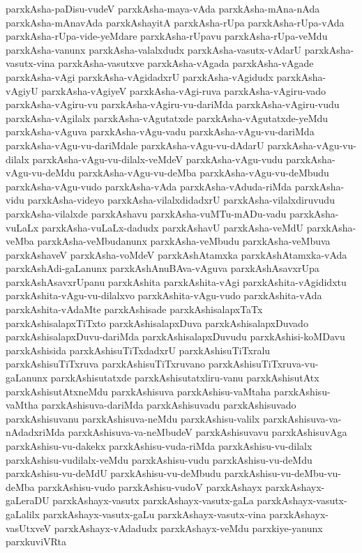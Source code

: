 {parxkAsha-paDisu-vudeV
parxkAsha-maya-vAda
parxkAsha-mAna-nAda
parxkAsha-mAnavAda
parxkAshayitA
parxkAsha-rUpa
parxkAsha-rUpa-vAda
parxkAsha-rUpa-vide-yeMdare
parxkAsha-rUpavu
parxkAsha-rUpa-veMdu
parxkAsha-vanunx
parxkAsha-valalxdudx
parxkAsha-vasutx-vAdarU
parxkAsha-vasutx-vina
parxkAsha-vasutxve
parxkAsha-vAgada
parxkAsha-vAgade
parxkAsha-vAgi
parxkAsha-vAgidadxrU
parxkAsha-vAgidudx
parxkAsha-vAgiyU
parxkAsha-vAgiyeV
parxkAsha-vAgi-ruva
parxkAsha-vAgiru-vado
parxkAsha-vAgiru-vu
parxkAsha-vAgiru-vu-dariMda
parxkAsha-vAgiru-vudu
parxkAsha-vAgilalx
parxkAsha-vAgutatxde
parxkAsha-vAgutatxde-yeMdu
parxkAsha-vAguva
parxkAsha-vAgu-vadu
parxkAsha-vAgu-vu-dariMda
parxkAsha-vAgu-vu-dariMdale
parxkAsha-vAgu-vu-dAdarU
parxkAsha-vAgu-vu-dilalx
parxkAsha-vAgu-vu-dilalx-veMdeV
parxkAsha-vAgu-vudu
parxkAsha-vAgu-vu-deMdu
parxkAsha-vAgu-vu-deMba
parxkAsha-vAgu-vu-deMbudu
parxkAsha-vAgu-vudo
parxkAsha-vAda
parxkAsha-vAduda-riMda
parxkAsha-vidu
parxkAsha-videyo
parxkAsha-vilalxdidadxrU
parxkAsha-vilalxdiruvudu
parxkAsha-vilalxde
parxkAshavu
parxkAsha-vuMTu-mADu-vadu
parxkAsha-vuLaLx
parxkAsha-vuLaLx-dadudx
parxkAshavU
parxkAsha-veMdU
parxkAsha-veMba
parxkAsha-veMbudanunx
parxkAsha-veMbudu
parxkAsha-veMbuva
parxkAshaveV
parxkAsha-voMdeV
parxkAshAtamxka
parxkAshAtamxka-vAda
parxkAshAdi-gaLanunx
parxkAshAnuBAva-vAguva
parxkAshAsavxrUpa
parxkAshAsavxrUpanu
parxkAshita
parxkAshita-vAgi
parxkAshita-vAgididxtu
parxkAshita-vAgu-vu-dilalxvo
parxkAshita-vAgu-vudo
parxkAshita-vAda
parxkAshita-vAdaMte
parxkAshisade
parxkAshisalapxTaTx
parxkAshisalapxTiTxto
parxkAshisalapxDuva
parxkAshisalapxDuvado
parxkAshisalapxDuvu-dariMda
parxkAshisalapxDuvudu
parxkAshisi-koMDavu
parxkAshisida
parxkAshisuTiTxdadxrU
parxkAshisuTiTxralu
parxkAshisuTiTxruva
parxkAshisuTiTxruvano
parxkAshisuTiTxruva-vu-gaLanunx
parxkAshisutatxde
parxkAshisutatxliru-vanu
parxkAshisutAtx
parxkAshisutAtxneMdu
parxkAshisuva
parxkAshisu-vaMtaha
parxkAshisu-vaMtha
parxkAshisuva-dariMda
parxkAshisuvadu
parxkAshisuvado
parxkAshisuvanu
parxkAshisuva-neMdu
parxkAshisu-valilx
parxkAshisuva-va-nAdadxriMda
parxkAshisuva-va-neMbudeV
parxkAshisuvavu
parxkAshisuvAga
parxkAshisu-vu-dakekx
parxkAshisu-vuda-riMda
parxkAshisu-vu-dilalx
parxkAshisu-vudilalx-veMdu
parxkAshisu-vudu
parxkAshisu-vu-deMdu
parxkAshisu-vu-deMdU
parxkAshisu-vu-deMbudu
parxkAshisu-vu-deMbu-vu-deMba
parxkAshisu-vudo
parxkAshisu-vudoV
parxkAshayx
parxkAshayx-gaLeraDU
parxkAshayx-vasutx
parxkAshayx-vasutx-gaLa
parxkAshayx-vasutx-gaLalilx
parxkAshayx-vasutx-gaLu
parxkAshayx-vasutx-vina
parxkAshayx-vasUtxveV
parxkAshayx-vAdadudx
parxkAshayx-veMdu
parxkiye-yanunx
parxkuviVRta
}
